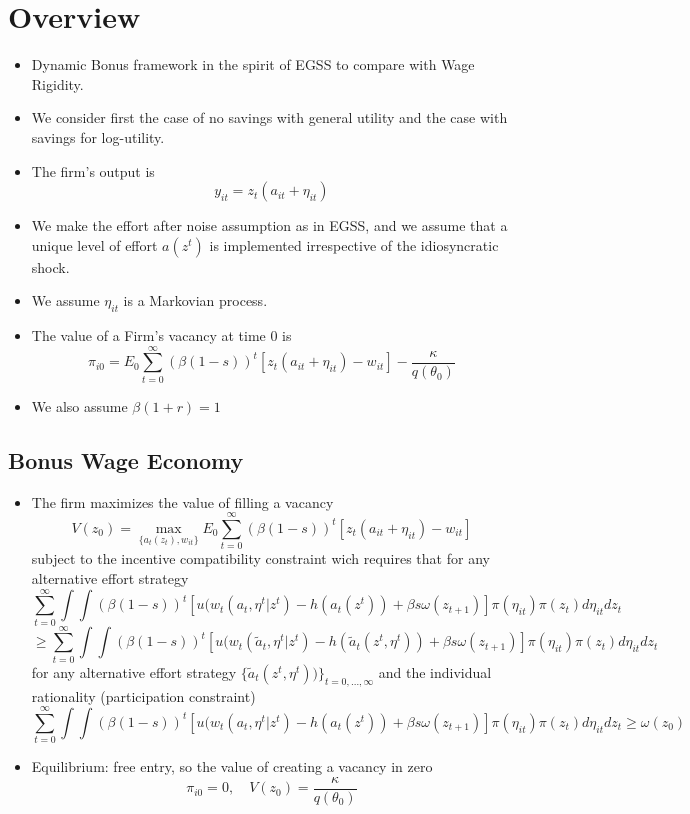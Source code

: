 \documentclass[11pt,a4paper]{article}
\begin{document}

\section{Overview}
\begin{itemize}
    \item Dynamic Bonus framework in the spirit of EGSS to compare with Wage Rigidity.
    \item  We consider first the case of no savings with general utility and the case with savings for log-utility.
    \item The firm's output is $$y_{it}=z_t(a_{it}+\eta_{it})$$
    \item We make the effort after noise assumption as in EGSS, and we assume that a unique level of effort $a(z^t)$ is implemented irrespective of the idiosyncratic shock.
    \item We assume $\eta_{it}$ is a Markovian process.
    \item The value of a Firm's vacancy at time 0 is
    $$\pi_{i0}=E_0 \sum_{t=0}^{\infty}(\beta (1-s))^t[z_t(a_{it}+\eta_{it})-w_{it}]-\frac{\kappa}{q(\theta_0)}$$ 
    \item We also assume $\beta(1+r)=1$
   
\end{itemize}



\subsection*{Bonus Wage Economy}

\begin{itemize}
    \item The firm maximizes the value of filling a vacancy
    $$V(z_0)=\max_{\{a_t(z_t),w_{it}\}} E_0 \sum_{t=0}^{\infty}(\beta (1-s))^t[z_t(a_{it}+\eta_{it})-w_{it}]$$
    subject to the incentive compatibility constraint wich requires that for any alternative effort strategy $$\sum_{t=0}^{\infty} \int \int (\beta (1-s))^t [u(w_t(a_t,\eta^t|z^t)-h(a_t(z^t))+\beta s \omega(z_{t+1})]\pi(\eta_{it})\pi(z_t)d\eta_{it}dz_t$$
     $$\geq \sum_{t=0}^{\infty} \int \int (\beta (1-s))^t [u(w_t(\tilde{a}_t,\eta^t|z^t)-h(\tilde{a}_t(z^t,\eta^t))+\beta s \omega(z_{t+1})]\pi(\eta_{it})\pi(z_t)d\eta_{it}dz_t$$ for any alternative effort strategy $\{\tilde{a}_t(z^t,\eta^t))\}_{t=0,\dots,\infty}$ and the individual rationality (participation constraint)
     $$\sum_{t=0}^{\infty} \int \int (\beta (1-s))^t [u(w_t(a_t,\eta^t|z^t)-h(a_t(z^t))+\beta s \omega(z_{t+1})]\pi(\eta_{it})\pi(z_t)d\eta_{it}dz_t \geq \omega(z_0)$$
     \item Equilibrium: free entry, so the value of creating a vacancy in zero
     $$\pi_{i0}=0,\quad V(z_0)=\frac{\kappa}{q(\theta_0)}$$
\end{itemize}
\end{document}
